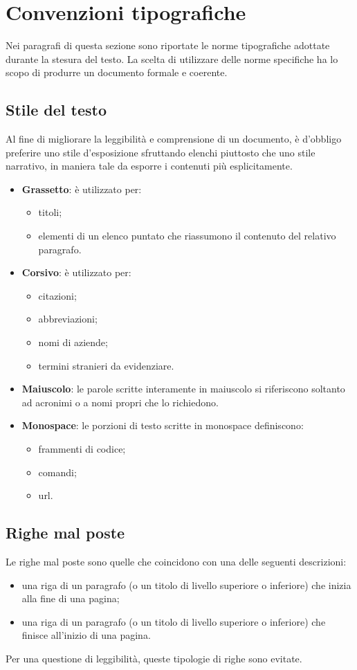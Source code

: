 \section{Convenzioni tipografiche}

Nei paragrafi di questa sezione sono riportate le norme tipografiche adottate durante la stesura del testo. La scelta di utilizzare delle norme specifiche ha lo scopo di produrre un documento formale e coerente.

\subsection{Stile del testo}
 Al fine di migliorare la leggibilità e comprensione di un documento, è d'obbligo preferire uno stile d'esposizione sfruttando elenchi piuttosto che uno stile narrativo, in maniera tale da esporre i contenuti più esplicitamente.
\begin{itemize}
	\item \textbf{Grassetto}: è utilizzato per:
	\begin{itemize}
		\item titoli;
		\item elementi di un elenco puntato che riassumono il contenuto del relativo paragrafo.
	\end{itemize}
	\item \textbf{Corsivo}: è utilizzato per:
	\begin{itemize}
		\item citazioni;
		\item abbreviazioni;
		\item nomi di aziende;
		\item termini stranieri da evidenziare.
	\end{itemize}
	\item \textbf{Maiuscolo}: le parole scritte interamente in maiuscolo si riferiscono soltanto ad acronimi o a nomi propri che lo richiedono.
	\item \textbf{Monospace}: le porzioni di testo scritte in monospace definiscono:
	\begin{itemize}
		\item frammenti di codice;
		\item comandi;
		\item \gls{url}.
	\end{itemize}
\end{itemize}

\subsection{Righe mal poste}
Le righe mal poste sono quelle che coincidono con una delle seguenti descrizioni:
\begin{itemize}
	\item una riga di un paragrafo (o un titolo di livello superiore o inferiore) che inizia alla fine di una pagina;
	\item una riga di un paragrafo (o un titolo di livello superiore o inferiore) che finisce all'inizio di una pagina.
\end{itemize}
Per una questione di leggibilità, queste tipologie di righe sono evitate.\\
